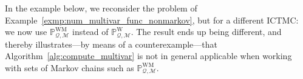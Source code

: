 \documentclass[10pt,a4paper]{paper}
\theoremstyle{definition}
\newcommand{\processes}{\mathbb{P}}
\newcommand{\wprocesses}{\processes^{\mathrm{W}}}
\newcommand{\wmprocesses}{\processes^{\mathrm{WM}}}
\newcommand{\rateset}{\mathcal{Q}}
\newcommand{\ictmc}{{ICTMC}}
\begin{document}
In the example below, we reconsider the problem of Example~\ref{exmp:num_multivar_func_nonmarkov}, but for a different {\ictmc}: we now use $\wmprocesses_{\rateset,\mathcal{M}}$ instead of $\wprocesses_{\rateset,\mathcal{M}}$. The result ends up being different, and thereby illustrates---by means of a counterexample---that Algorithm~\ref{alg:compute_multivar} is not in general applicable when working with sets of Markov chains such as $\wmprocesses_{\rateset,\mathcal{M}}$.

\end{document}
